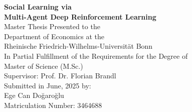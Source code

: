\documentclass[a4paper,12pt]{report}
\begin{document}
\begin{titlepage}
\begin{center}
\vspace*{2cm}

{\Large \textbf{Social Learning via\\[0.25cm]Multi-Agent Deep Reinforcement Learning}}\\[6cm]

Master Thesis Presented to the\\
Department of Economics at the\\
Rheinische Friedrich-Wilhelms-Universität Bonn\\[1cm]

In Partial Fulfillment of the Requirements for the Degree of\\
Master of Science (M.Sc.)\\[4cm]

Supervisor: Prof. Dr. Florian Brandl\\[2cm]

Submitted in June, 2025 by:\\
Ege Can Doğaroğlu\\
Matriculation Number: 3464688

\end{center}
\end{titlepage}

\end{document}
